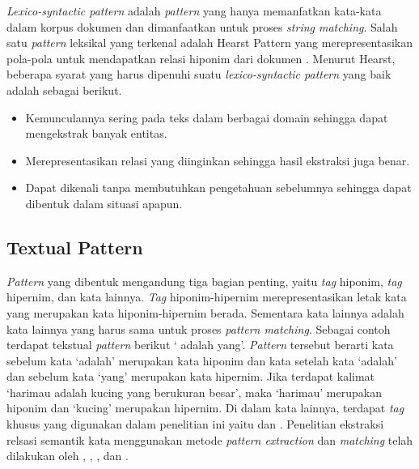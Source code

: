 \textit{Lexico-syntactic pattern} adalah \textit{pattern} yang hanya memanfatkan kata-kata dalam korpus dokumen dan dimanfaatkan untuk proses \textit{string matching}. Salah satu \textit{pattern} leksikal yang terkenal adalah Hearst Pattern yang merepresentasikan pola-pola untuk mendapatkan relasi hiponim dari dokumen \citep{hearst1992automatic}. Menurut Hearst, beberapa syarat yang harus dipenuhi suatu \textit{lexico-syntactic pattern} yang baik adalah sebagai berikut.
\begin{itemize}
  \item Kemunculannya sering pada teks dalam berbagai domain sehingga dapat mengekstrak banyak entitas.
  \item Merepresentasikan relasi yang diinginkan sehingga hasil ekstraksi juga benar.
  \item Dapat dikenali tanpa membutuhkan pengetahuan sebelumnya sehingga dapat dibentuk dalam situasi apapun.
\end{itemize}

\subsection{Textual Pattern}
\textit{Pattern} yang dibentuk mengandung tiga bagian penting, yaitu \textit{tag} hiponim, \textit{tag} hipernim, dan kata lainnya. \textit{Tag} hiponim-hipernim merepresentasikan letak kata yang merupakan kata hiponim-hipernim berada. Sementara kata lainnya adalah kata lainnya yang harus sama untuk proses \textit{pattern matching}. Sebagai contoh terdapat tekstual \textit{pattern} berikut `{\tagHyponym} adalah {\tagHypernym} yang'. \textit{Pattern} tersebut berarti kata sebelum kata `adalah' merupakan kata hiponim dan kata setelah kata `adalah' dan sebelum kata `yang' merupakan kata hipernim. Jika terdapat kalimat `harimau adalah kucing yang berukuran besar', maka `harimau' merupakan hiponim dan `kucing' merupakan hipernim. Di dalam kata lainnya, terdapat \textit{tag} khusus yang digunakan dalam penelitian ini yaitu {\tagStart} dan {\tagEnd}. Penelitian ekstraksi relsasi semantik kata menggunakan metode \textit{pattern extraction} dan \textit{matching} telah dilakukan oleh \cite{hearst1992automatic}, \cite{ruiz2005automatic}, \cite{arnold2014extracting}, dan \cite{sumida2008hacking}.

